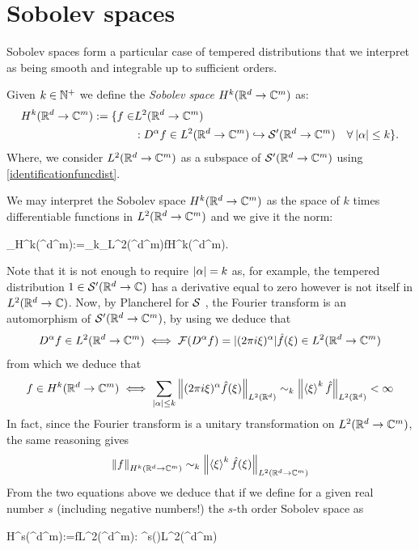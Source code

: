 \documentclass[
    a4paper,
    DIV=14,
    abstract=true,
    numbers=noenddot
]{scrartcl}
\begin{document}
\bigbreak
\section{Sobolev spaces}
Sobolev spaces form a particular case of tempered distributions that we interpret as being smooth and integrable up to sufficient orders.
\begin{definition}\label{sobolevdef}
	Given $k\in\mathbb{N}^+$ we define the \emph{Sobolev space} $H^k(\mathbb{R}^d\to\mathbb{C}^m)$ as:
	\begin{align*}
		H^k(\mathbb{R}^d\to\mathbb{C}^m):=
 \lbrace f\in &L^2(\mathbb{R}^d\to\mathbb{C}^m)\\&: D^\alpha f\in L^2(\mathbb{R}^d\to\mathbb{C}^m)\hookrightarrow\mathcal{S} '(\mathbb{R}^d\to\mathbb{C}^m)\quad\forall\hspace{2pt}{\left| \alpha \right|}\leq k\rbrace.
	\end{align*}
	Where,  we consider $L^2(\mathbb{R}^d\to\mathbb{C}^m)$ as a subspace of $\mathcal{S} '(\mathbb{R}^d\to\mathbb{C}^m)$ using \eqref{identificationfuncdist}.\end{definition} We may interpret the Sobolev space $H^k(\mathbb{R}^d\to\mathbb{C}^m)$ as the space of $k$ times differentiable functions in $L^2(\mathbb{R}^d\to\mathbb{C}^m)$ and we give it the norm:
\begin{aligneq}\label{normdef1}
	_{H^k(\R^d\to\C^m)}:=\sum_{\abs{\alpha}\leq k}_{L^2(\R^d\to\C^m)}\qquad f\in H^k(\R^d\to\C^m).
\end{aligneq}

Note that it is not enough to require ${\left| \alpha \right|}=k$ as, for example, the tempered distribution $1 \in \mathcal{S}'(\mathbb{R}^d\to\mathbb{C})$ has a derivative equal to zero however is not itself in $L^2(\mathbb{R}^d\to\mathbb{C})$. Now, by Plancherel for $\mathcal{S}$ , the Fourier transform is an automorphism of $\mathcal{S}'(\mathbb{R}^d\to\mathbb{C}^m)$, by using   we deduce that
\[D^\alpha f\in L^2(\mathbb{R}^d\to\mathbb{C}^m)\iff \mathcal{F} (D^\alpha f)={\left| (2\pi i\xi )^{\alpha} \right|} \hat{f}(\xi)\in L^2(\mathbb{R}^d\to\mathbb{C}^m)\]
from which we deduce that
\begin{equation}\label{sobolevcondition}
f\in H^k(\mathbb{R}^d\to\mathbb{C}^m)\iff \sum_{{\left| \alpha \right|}\leq k} \left\lVert (2\pi i\xi )^{\alpha}\hat{f}(\xi) \right\rVert_{L^2(\mathbb{R}^d)} \sim_k \left\lVert \left\langle\xi\right\rangle^k\hat{f} \right\rVert_{L^2(\mathbb{R}^d)} < \infty
\end{equation}
In fact, since the Fourier transform is a unitary transformation on $L^2(\mathbb{R}^d\to\mathbb{C}^m)$, the same reasoning gives
\begin{equation}\label{sobolevnorm}
	\left\lVert f \right\rVert_{H^k(\mathbb{R}^d\to\mathbb{C}^m)}\sim_k \left\lVert \left\langle\xi\right\rangle^k\hat{f}(\xi) \right\rVert_{L^2(\mathbb{R}^d\to\mathbb{C}^m)}
\end{equation}
From the two equations above we deduce that if we define for a given real number $s$ (including negative numbers!) the $s$-th order Sobolev space as
\begin{aligneq}\label{fracsobdef}
	H^s(\R^d\to\C^m):=\lbrace f\in L^2(\R^d\to\C^m): \br{\xi}^s(\xi)\in L^2(\R^d\to\C^m)\rbrace
\end{aligneq}
\end{document}
